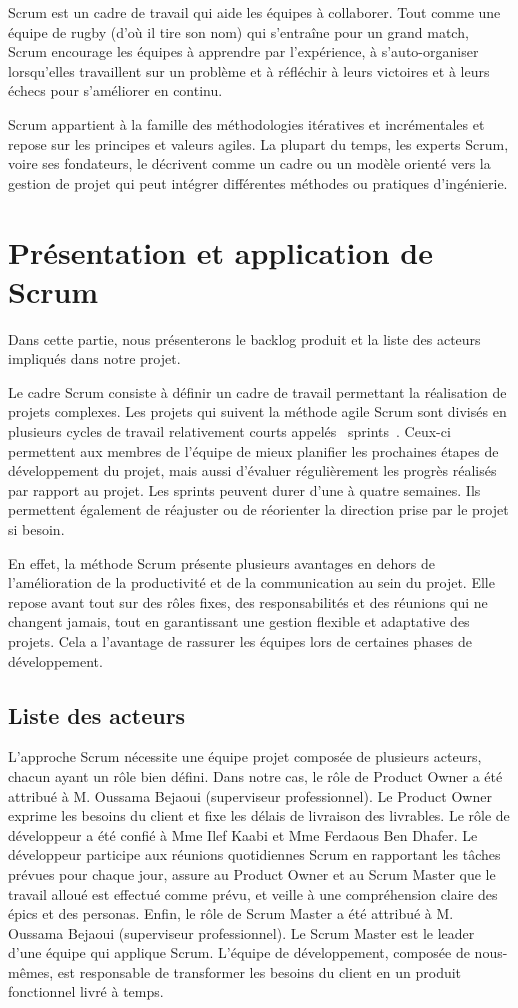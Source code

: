 \documentclass[12pt, letterpaper]{article}
\begin{document}
Scrum est un cadre de travail qui aide les équipes à collaborer. Tout comme une équipe de rugby (d'où il tire son nom) qui s'entraîne pour un grand match, Scrum encourage les équipes à apprendre par l'expérience, à s'auto-organiser lorsqu'elles travaillent sur un problème et à réfléchir à leurs victoires et à leurs échecs pour s'améliorer en continu.

Scrum appartient à la famille des méthodologies itératives et incrémentales et repose sur les principes et valeurs agiles. La plupart du temps, les experts Scrum, voire ses fondateurs, le décrivent comme un cadre ou un modèle orienté vers la gestion de projet qui peut intégrer différentes méthodes ou pratiques d'ingénierie.

\section{ Présentation et application de Scrum}
Dans cette partie, nous présenterons le backlog produit et la liste des acteurs impliqués dans notre projet.

Le cadre Scrum consiste à définir un cadre de travail permettant la réalisation de projets complexes. Les projets qui suivent la méthode agile Scrum sont divisés en plusieurs cycles de travail relativement courts appelés  sprints . Ceux-ci permettent aux membres de l'équipe de mieux planifier les prochaines étapes de développement du projet, mais aussi d'évaluer régulièrement les progrès réalisés par rapport au projet. Les sprints peuvent durer d'une à quatre semaines. Ils permettent également de réajuster ou de réorienter la direction prise par le projet si besoin.

En effet, la méthode Scrum présente plusieurs avantages en dehors de l'amélioration de la productivité et de la communication au sein du projet. Elle repose avant tout sur des rôles fixes, des responsabilités et des réunions qui ne changent jamais, tout en garantissant une gestion flexible et adaptative des projets. Cela a l'avantage de rassurer les équipes lors de certaines phases de développement.

\subsection{Liste des acteurs}
L'approche Scrum nécessite une équipe projet composée de plusieurs acteurs, chacun ayant un rôle bien défini. Dans notre cas, le rôle de Product Owner a été attribué à M. Oussama Bejaoui (superviseur professionnel). Le Product Owner exprime les besoins du client et fixe les délais de livraison des livrables. Le rôle de développeur a été confié à Mme Ilef Kaabi et Mme Ferdaous Ben Dhafer. Le développeur participe aux réunions quotidiennes Scrum en rapportant les tâches prévues pour chaque jour, assure au Product Owner et au Scrum Master que le travail alloué est effectué comme prévu, et veille à une compréhension claire des épics et des personas. Enfin, le rôle de Scrum Master a été attribué à M. Oussama Bejaoui (superviseur professionnel). Le Scrum Master est le leader d'une équipe qui applique Scrum. L'équipe de développement, composée de nous-mêmes, est responsable de transformer les besoins du client en un produit fonctionnel livré à temps.
\end{document}
